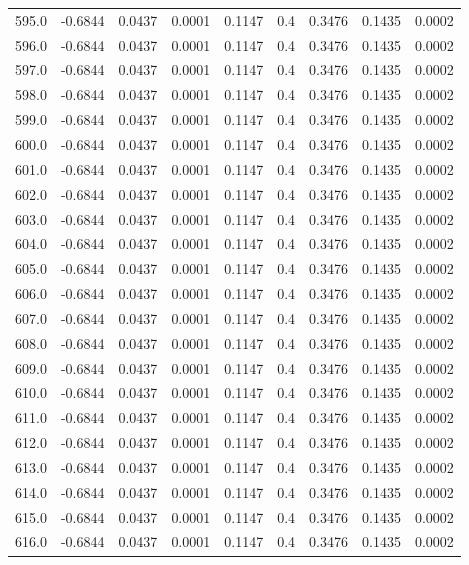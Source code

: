 \begin{longtable}{lrrrrrrrr}
595.0 & -0.6844 & 0.0437 & 0.0001 & 0.1147 & 0.4 & 0.3476 & 0.1435 & 0.0002 \\
596.0 & -0.6844 & 0.0437 & 0.0001 & 0.1147 & 0.4 & 0.3476 & 0.1435 & 0.0002 \\
597.0 & -0.6844 & 0.0437 & 0.0001 & 0.1147 & 0.4 & 0.3476 & 0.1435 & 0.0002 \\
598.0 & -0.6844 & 0.0437 & 0.0001 & 0.1147 & 0.4 & 0.3476 & 0.1435 & 0.0002 \\
599.0 & -0.6844 & 0.0437 & 0.0001 & 0.1147 & 0.4 & 0.3476 & 0.1435 & 0.0002 \\
600.0 & -0.6844 & 0.0437 & 0.0001 & 0.1147 & 0.4 & 0.3476 & 0.1435 & 0.0002 \\
601.0 & -0.6844 & 0.0437 & 0.0001 & 0.1147 & 0.4 & 0.3476 & 0.1435 & 0.0002 \\
602.0 & -0.6844 & 0.0437 & 0.0001 & 0.1147 & 0.4 & 0.3476 & 0.1435 & 0.0002 \\
603.0 & -0.6844 & 0.0437 & 0.0001 & 0.1147 & 0.4 & 0.3476 & 0.1435 & 0.0002 \\
604.0 & -0.6844 & 0.0437 & 0.0001 & 0.1147 & 0.4 & 0.3476 & 0.1435 & 0.0002 \\
605.0 & -0.6844 & 0.0437 & 0.0001 & 0.1147 & 0.4 & 0.3476 & 0.1435 & 0.0002 \\
606.0 & -0.6844 & 0.0437 & 0.0001 & 0.1147 & 0.4 & 0.3476 & 0.1435 & 0.0002 \\
607.0 & -0.6844 & 0.0437 & 0.0001 & 0.1147 & 0.4 & 0.3476 & 0.1435 & 0.0002 \\
608.0 & -0.6844 & 0.0437 & 0.0001 & 0.1147 & 0.4 & 0.3476 & 0.1435 & 0.0002 \\
609.0 & -0.6844 & 0.0437 & 0.0001 & 0.1147 & 0.4 & 0.3476 & 0.1435 & 0.0002 \\
610.0 & -0.6844 & 0.0437 & 0.0001 & 0.1147 & 0.4 & 0.3476 & 0.1435 & 0.0002 \\
611.0 & -0.6844 & 0.0437 & 0.0001 & 0.1147 & 0.4 & 0.3476 & 0.1435 & 0.0002 \\
612.0 & -0.6844 & 0.0437 & 0.0001 & 0.1147 & 0.4 & 0.3476 & 0.1435 & 0.0002 \\
613.0 & -0.6844 & 0.0437 & 0.0001 & 0.1147 & 0.4 & 0.3476 & 0.1435 & 0.0002 \\
614.0 & -0.6844 & 0.0437 & 0.0001 & 0.1147 & 0.4 & 0.3476 & 0.1435 & 0.0002 \\
615.0 & -0.6844 & 0.0437 & 0.0001 & 0.1147 & 0.4 & 0.3476 & 0.1435 & 0.0002 \\
616.0 & -0.6844 & 0.0437 & 0.0001 & 0.1147 & 0.4 & 0.3476 & 0.1435 & 0.0002 \\

\end{longtable}
